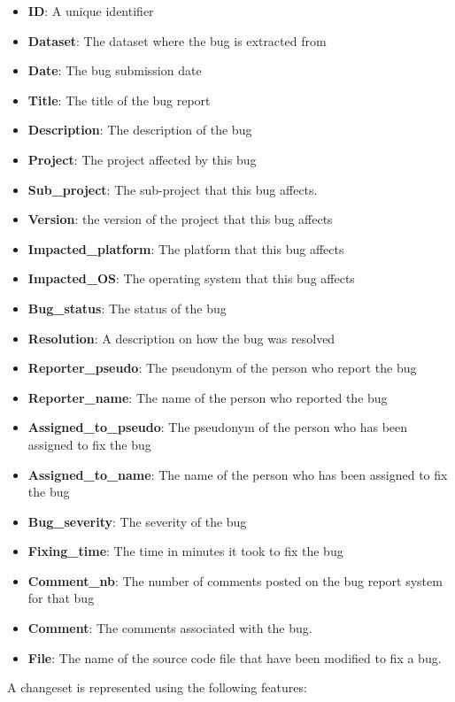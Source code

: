 \documentclass{sig-alternate-05-2015}
\begin{document}
\begin{itemize}

  \item \textbf{ID}: A unique identifier
  \item 	\textbf{Dataset}: The dataset where the bug is extracted from
  \item 	\textbf{Date}: The bug submission date
  \item 	\textbf{Title}: The title of the bug report
  \item 	\textbf{Description}: The description of the bug
  \item 	\textbf{Project}: The project affected by this bug
  \item 	\textbf{Sub\_project}: The sub-project that this bug affects.
  \item 	\textbf{Version}: the version of the project that this bug
  affects
  \item 	\textbf{Impacted\_platform}: The platform that this bug
  affects
  \item 	\textbf{Impacted\_OS}: The operating system that this bug
  affects
  \item 	\textbf{Bug\_status}: The status of the bug
  \item 	\textbf{Resolution}: A description on how the bug was
  resolved
  \item 	\textbf{Reporter\_pseudo}: The pseudonym of the person who
  report the bug
  \item 	\textbf{Reporter\_name}: The name of the person who
  reported the bug
  \item 	\textbf{Assigned\_to\_pseudo}: The pseudonym of the person
  who has been assigned to fix the bug
  \item 	\textbf{Assigned\_to\_name}: The name of the person who has
  been assigned to fix the bug
  \item 	\textbf{Bug\_severity}: The severity of the bug
  \item 	\textbf{Fixing\_time}: The time in minutes it took to fix the
  bug
  \item 	\textbf{Comment\_nb}: The number of comments posted on
  the bug report system for that bug
  \item 	\textbf{Comment}: The comments associated with the bug.
  \item 	\textbf{File}: The name of the source code file that have been
  modified to fix a bug.
\end{itemize}


A changeset is represented using the following features:
\end{document}
